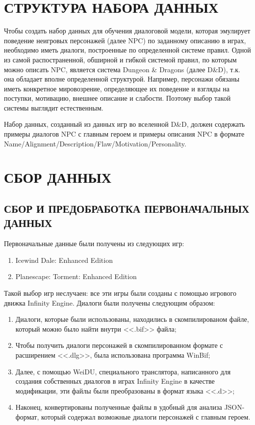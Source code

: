 \section{СТРУКТУРА НАБОРА ДАННЫХ}
Чтобы создать набор данных для обучения диалоговой модели, которая эмулирует поведение  неигровых персонажей (далее NPC) по заданному описанию в играх, необходимо иметь диалоги, построенные по определенной системе правил. Одной из самой распостраненной, обширной и гибкой системой правил, по которым можно описать NPC, является система Dungeon \& Dragons (далее D\&D), т.к. она обладает вполне определенной структурой. Например, персонажи обязаны иметь конкретное мировозрение, определяющее их поведение и взгляды на поступки, мотивацию, внешнее описание и слабости. Поэтому выбор такой системы выглядит естественным. 

Набор данных, созданный из данных игр во вселенной D\&D, должен содержать примеры диалогов NPC с главным героем и примеры описания NPC в формате Name/Alignment/Description/Flaw/Motivation/Personality.

\section{СБОР ДАННЫХ}
\subsection{СБОР И ПРЕДОБРАБОТКА ПЕРВОНАЧАЛЬНЫХ ДАННЫХ}
Первоначальные данные были получены из следующих игр: 
\begin{enumerate}
      \item Icewind Dale: Enhanced Edition
      \item Planescape: Torment: Enhanced Edition
\end{enumerate}

Такой выбор игр неслучаен: все эти игры были созданы с помощью 
игрового движка Infinity Engine. Диалоги были получены следующим образом:
\begin{enumerate}
      \item Диалоги, которые были использованы, находились в скомпилированом файле, который можно было найти внутри <<.bif>> файла;
      \item Чтобы получить диалоги персонажей в скомпилированном формате с расширением <<.dlg>>,
            была использована программа WinBif;
      \item Далее, с помощью WeiDU, специального транслятора,
            написанного для создания собственных диалогов в играх Infinity Engine в качестве модификации, 
            эти файлы были преобразованы в формат языка <<.d>>; 
      \item Наконец, конвертированы полученные файлы в удобный для анализа JSON-формат,
            который содержал возможные диалоги персонажей с главным героем.
\end{enumerate}

